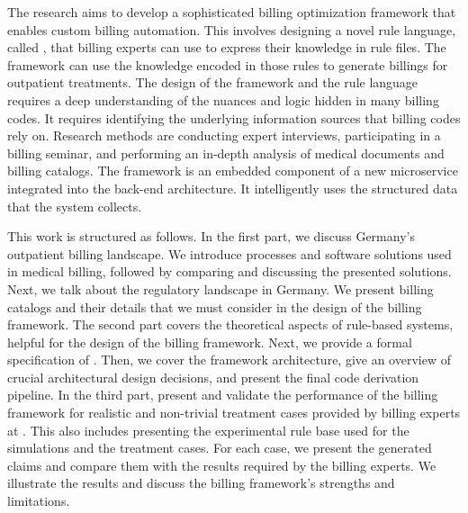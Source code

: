 The research aims to develop a sophisticated billing optimization framework that enables custom billing automation.
This involves designing a novel rule language, called \RL, that billing experts can use to express their knowledge in rule files.
The framework can use the knowledge encoded in those rules to generate billings for outpatient treatments.
The design of the framework and the rule language requires a deep understanding of the nuances and logic hidden in many billing codes.
It requires identifying the underlying information sources that billing codes rely on.
Research methods are conducting expert interviews, participating in a billing seminar, and performing an in-depth analysis of medical documents and billing catalogs.
The framework is an embedded component of a new microservice integrated into the \AV back-end architecture.
It intelligently uses the structured data that the \AV system collects.

This work is structured as follows.
In the first part, we discuss Germany's outpatient billing landscape.
We introduce processes and software solutions used in medical billing, followed by comparing and discussing the presented solutions.
Next, we talk about the regulatory landscape in Germany.
We present billing catalogs and their details that we must consider in the design of the billing framework.
The second part covers the theoretical aspects of rule-based systems, helpful for the design of the billing framework.
Next, we provide a formal specification of \RL.
Then, we cover the framework architecture, give an overview of crucial architectural design decisions, and present the final code derivation pipeline.
In the third part, present and validate the performance of the billing framework for realistic and non-trivial treatment cases provided by billing experts at \AV.
This also includes presenting the experimental rule base used for the simulations and the treatment cases.
For each case, we present the generated claims and compare them with the results required by the billing experts.
We illustrate the results and discuss the billing framework's strengths and limitations.
